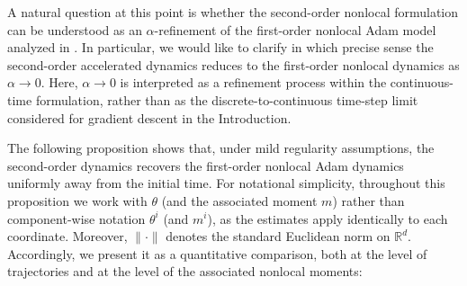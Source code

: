 \documentclass{article} %
\begin{document}
A natural question at this point is whether the second-order nonlocal formulation can be understood as an $\alpha$-refinement of the first-order nonlocal Adam model analyzed in \cite{heredia2025modelingadagradrmspropadam}. In particular, we would like to clarify in which precise sense the second-order accelerated dynamics reduces to the first-order nonlocal dynamics as $\alpha \to 0$. Here, $\alpha\to0$ is interpreted as a refinement process within the continuous-time formulation, rather than as the discrete-to-continuous time-step limit considered for gradient descent in the Introduction.

The following proposition shows that, under mild regularity assumptions, the second-order dynamics recovers the first-order nonlocal Adam dynamics uniformly away from the initial time. For notational simplicity, throughout this proposition we work with $\theta$ (and the associated moment $m$) rather than component-wise notation $\theta^{i}$ (and $m^{i}$), as the estimates apply identically to each coordinate. Moreover, $\|\cdot\|$ denotes the standard Euclidean norm on $\mathbb{R}^d$. Accordingly, we present it as a quantitative comparison, both at the level of trajectories and at the level of the associated nonlocal moments:
\end{document}
